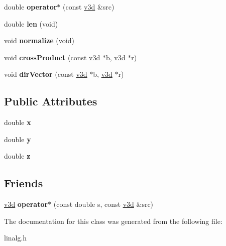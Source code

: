 \begin{DoxyCompactItemize}
\item 
\hypertarget{classv3d_a71635eb48247495e9ad5de341cbbd3ed}{double {\bfseries operator$\ast$} (const \hyperlink{classv3d}{v3d} \&src)}\label{classv3d_a71635eb48247495e9ad5de341cbbd3ed}

\item 
\hypertarget{classv3d_a065f3d49469b5b0d2f5139ff731f6b9c}{double {\bfseries len} (void)}\label{classv3d_a065f3d49469b5b0d2f5139ff731f6b9c}

\item 
\hypertarget{classv3d_a2f4eeb1eb57be6e936dee3ef17b0f414}{void {\bfseries normalize} (void)}\label{classv3d_a2f4eeb1eb57be6e936dee3ef17b0f414}

\item 
\hypertarget{classv3d_a65b7fea3f806314f43b541b360ccb9d1}{void {\bfseries cross\-Product} (const \hyperlink{classv3d}{v3d} $\ast$b, \hyperlink{classv3d}{v3d} $\ast$r)}\label{classv3d_a65b7fea3f806314f43b541b360ccb9d1}

\item 
\hypertarget{classv3d_afa261be11e3992fda4614568eee1714e}{void {\bfseries dir\-Vector} (const \hyperlink{classv3d}{v3d} $\ast$b, \hyperlink{classv3d}{v3d} $\ast$r)}\label{classv3d_afa261be11e3992fda4614568eee1714e}

\end{DoxyCompactItemize}
\subsection*{Public Attributes}
\begin{DoxyCompactItemize}
\item 
\hypertarget{classv3d_afcb1f905cc5fd92be97e6c73f1acc889}{double {\bfseries x}}\label{classv3d_afcb1f905cc5fd92be97e6c73f1acc889}

\item 
\hypertarget{classv3d_a88489eb7147908fa2bfc3145e7ae87a1}{double {\bfseries y}}\label{classv3d_a88489eb7147908fa2bfc3145e7ae87a1}

\item 
\hypertarget{classv3d_a151ca7fcb69620e5096016f44f970f07}{double {\bfseries z}}\label{classv3d_a151ca7fcb69620e5096016f44f970f07}

\end{DoxyCompactItemize}
\subsection*{Friends}
\begin{DoxyCompactItemize}
\item 
\hypertarget{classv3d_a31e32e9fdf184b9dc9215ded2600c20a}{\hyperlink{classv3d}{v3d} {\bfseries operator$\ast$} (const double s, const \hyperlink{classv3d}{v3d} \&src)}\label{classv3d_a31e32e9fdf184b9dc9215ded2600c20a}

\end{DoxyCompactItemize}


The documentation for this class was generated from the following file\-:\begin{DoxyCompactItemize}
\item 
linalg.\-h\end{DoxyCompactItemize}
